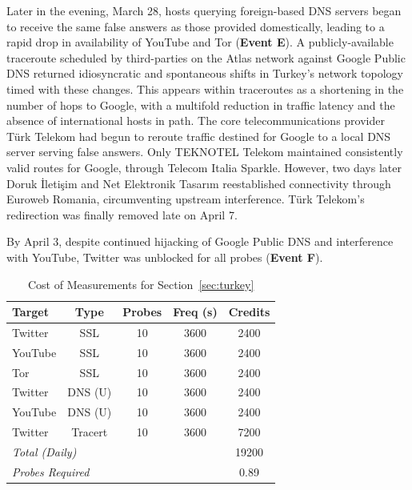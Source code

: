 Later in the evening, March 28, hosts querying foreign-based DNS servers
began to receive the same false answers as those provided domestically,
leading to a rapid drop in availability of YouTube and Tor
(\textbf{Event E}). A publicly-available traceroute scheduled by
third-parties on the Atlas network against Google Public DNS returned
idiosyncratic and spontaneous shifts in Turkey's network topology timed
with these changes. This appears within traceroutes as a shortening in
the number of hops to Google, with a multifold reduction in traffic
latency and the absence of international hosts in path. The core
telecommunications provider T\"{u}rk Telekom had begun to reroute
traffic destined for Google to a local DNS server serving false answers.
Only TEKNOTEL Telekom maintained consistently valid routes for Google,
through Telecom Italia Sparkle. However, two days later Doruk
\.{I}leti\c{s}im and Net Elektronik Tasar{\i}m reestablished
connectivity through Euroweb Romania, circumventing upstream
interference. T\"{u}rk Telekom's redirection was finally removed late on
April 7.

By April 3, despite continued hijacking of Google Public DNS and
interference with YouTube, Twitter was unblocked for all probes
(\textbf{Event F}).

\begin{table}
    \begin{tabular}{l | c | c | c | c}
        \textbf{Target} & \textbf{Type}  & \textbf{Probes}  & \textbf{Freq (s)}  & \textbf{Credits}\\
        \hline
		 Twitter & SSL & 10 & 3600 & 2400 \\
		 YouTube & SSL & 10 & 3600 & 2400 \\
		 Tor & SSL & 10 & 3600 & 2400 \\
		 Twitter & DNS (U) & 10 & 3600 & 2400 \\
		 YouTube & DNS (U) & 10 & 3600 & 2400 \\
		 Twitter & Tracert & 10 & 3600 & 7200 \\
        \hline
        \multicolumn{4}{l}{\textit{Total (Daily)}}  & 19200\\
        \multicolumn{4}{l}{\textit{Probes Required}} & 0.89\\
        \hline        
    \end{tabular}
    \caption{Cost of Measurements for Section~\ref{sec:turkey}}
    \label{table:tr-costs}
\end{table}

